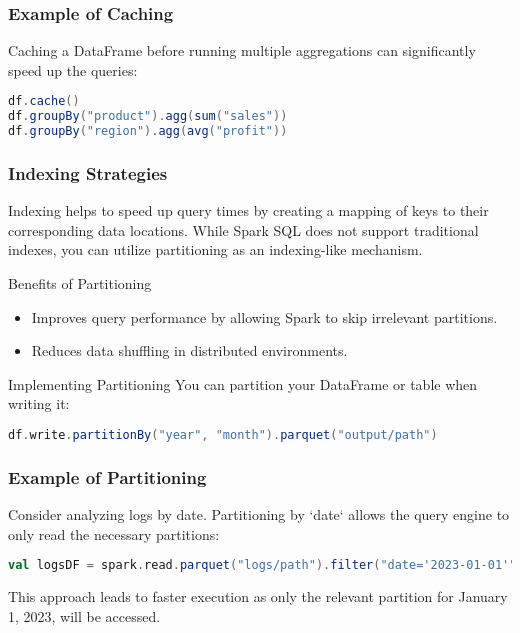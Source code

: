 \documentclass[aspectratio=169]{beamer}
\begin{document}
\begin{frame}[fragile]
  \frametitle{Example of Caching}
  Caching a DataFrame before running multiple aggregations can significantly speed up the queries:
  
  \begin{lstlisting}[language=Scala]
df.cache()
df.groupBy("product").agg(sum("sales"))
df.groupBy("region").agg(avg("profit"))
  \end{lstlisting}
\end{frame}

\begin{frame}[fragile]
  \frametitle{Indexing Strategies}
  Indexing helps to speed up query times by creating a mapping of keys to their corresponding data locations. While Spark SQL does not support traditional indexes, you can utilize partitioning as an indexing-like mechanism.
  
  \begin{block}{Benefits of Partitioning}
    \begin{itemize}
      \item Improves query performance by allowing Spark to skip irrelevant partitions.
      \item Reduces data shuffling in distributed environments.
    \end{itemize}
  \end{block}

  \begin{block}{Implementing Partitioning}
    You can partition your DataFrame or table when writing it:
    \begin{lstlisting}[language=Scala]
df.write.partitionBy("year", "month").parquet("output/path")
    \end{lstlisting}
  \end{block}
\end{frame}

\begin{frame}[fragile]
  \frametitle{Example of Partitioning}
  Consider analyzing logs by date. Partitioning by `date` allows the query engine to only read the necessary partitions:
  
  \begin{lstlisting}[language=Scala]
val logsDF = spark.read.parquet("logs/path").filter("date='2023-01-01'")
  \end{lstlisting}
  
  This approach leads to faster execution as only the relevant partition for January 1, 2023, will be accessed.
\end{frame}
\end{document}

